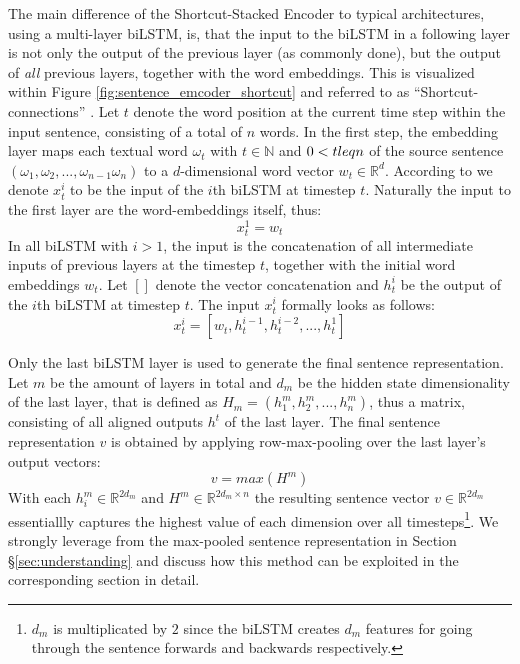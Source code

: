 \noindent
The main difference of the Shortcut-Stacked Encoder to typical architectures, using a multi-layer \ac{biLSTM}, is, that the input to the \ac{biLSTM} in a following layer is not only the output of the previous layer (as commonly done), but the output of \textit{all} previous layers, together with the word embeddings. This is visualized within Figure \ref{fig:sentence_emcoder_shortcut} and referred to as ``Shortcut-connections'' \citep{nie2017shortcut}. Let $t$ denote the word position at the current time step within the input sentence, consisting of a total of $n$ words. In the first step, the embedding layer maps each textual word $\omega_t$ with $t \in \mathbb{N}$ and $0 < t \\leq n$ of the source sentence $(\omega_1, \omega_2, ..., \omega_{n-1} \omega_n)$ to a $d$-dimensional word vector $w_t \in \mathbb{R}^d$. According to \cite{nie2017shortcut} we denote $x_t^i$ to be the input of the $i$th \ac{biLSTM} at timestep $t$. Naturally the input to the first layer are the word-embeddings itself, thus:
\begin{equation}
x_t^1 = w_t
\end{equation} 
In all \ac{biLSTM} with $i > 1$, the input is the concatenation of all intermediate inputs of previous layers at the timestep $t$, together with the initial word embeddings $w_t$. Let $[]$ denote the vector concatenation and $h^i_t$ be the output of the $i$th \ac{biLSTM} at timestep $t$. The input $x^i_t$ formally looks as follows:
\begin{equation}\label{eq:stacked_encoder_input}
x_t^i = [w_t, h_t^{i-1}, h_t^{i-2}, ... , h_t^1]
\end{equation}

\noindent
Only the last \ac{biLSTM} layer is used to generate the final sentence representation. Let $m$ be the amount of layers in total and $d_m$ be the hidden state dimensionality of the last layer, that is defined as $H_m=(h_1^m, h_2^m, ..., h_n^m)$, thus a matrix, consisting of all aligned outputs $h^t$ of the last layer. The final sentence representation $v$ is obtained by applying row-max-pooling over the last layer's output vectors:
\begin{equation}
v = max(H^m)
\end{equation}
With each $h_i^m \in \mathbb{R}^{2d_m}$ and $H^m \in \mathbb{R}^{2d_m \times n}$ the resulting sentence vector $v \in \mathbb{R}^{2d_m}$ essentiallly captures the highest value of each dimension over all timesteps\footnote{$d_m$ is multiplicated by $2$ since the \ac{biLSTM} creates $d_m$ features for going through the sentence forwards and backwards respectively.}. We strongly leverage from the max-pooled sentence representation in Section §\ref{sec:understanding} and discuss how this method can be exploited in the corresponding section in detail.
